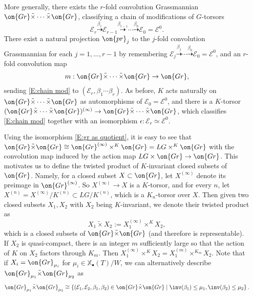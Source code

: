 \documentclass[11pt]{amsart}
\theoremstyle{definition}
\theoremstyle{definition}
\theoremstyle{definition}
\numberwithin{equation}{subsection}
\newcommand{\mE}{{\mathcal E}}
\newcommand{\Gr}{{\on{Gr}}}
\newcommand{\pr}{{\on{pr}}}
\def\xcoch{\mathbb{X}_\bullet}
\begin{document}
More generally, there exists the $r$-fold convolution Grassmannian $\Gr\tilde\times\cdots\tilde\times\Gr$, classifying a chain of modifications of $G$-torsors
\begin{equation}
\label{E:chain mod}
\mE_r\stackrel{\beta_r}{\dashrightarrow}\mE_{r-1}\stackrel{\beta_{r-1}}{\dashrightarrow}\cdots\stackrel{\beta_0}{\dashrightarrow}\mE_0=\mE^0.
\end{equation}
There exist a natural projection $\pr_j$ to the $j$-fold convolution Grassmannian for each $j=1,\ldots,r-1$ by remembering $\mE_j\stackrel{\beta_j}{\dashrightarrow}\cdots\stackrel{\beta_0}{\dashrightarrow}\mE_0=\mE^0$, and
an $r$-fold convolution map
\begin{equation}\label{conv m}
m:\Gr\tilde\times\cdots\tilde\times\Gr\to \Gr,
\end{equation}
sending \eqref{E:chain mod} to $(\mE_r, \beta_1\cdots\beta_r)$. As before, $K$ acts naturally on $\Gr\tilde\times\cdots\tilde\times\Gr$ as automorphisms of $\mE_0=\mE^0$, and there is a $K$-torsor $(\Gr\tilde\times\cdots\tilde\times\Gr)^{(\infty)}\to\Gr\tilde\times\cdots\tilde\times\Gr$, which classifies \eqref{E:chain mod} together with an isomorphism $\epsilon:\mE_r\simeq \mE^0$.


Using the isomorphism \eqref{E:gr as quotient}, it is easy to see that $\Gr\tilde\times\Gr\cong \Gr^{(\infty)}\times^K\Gr=LG\times^K\Gr$
with the convolution map induced by the action map $LG\times\Gr\to \Gr$. 
This motivates us to define the twisted product of $K$-invariant closed subsets of $\Gr$. Namely,
for a closed subset $X\subset \Gr$, let $X^{(\infty)}$ denote its preimage in $\Gr^{(\infty)}$. So $X^{(\infty)}\to X$ is a $K$-torsor, and for every $n$, let $X^{(n)}=X^{(\infty)}/K^{(n)}\subset LG/K^{(n)}$, which is a $K_n$-torsor over $X$.
Then given two closed subsets $X_1, X_2$ with $X_2$ being $K$-invariant, we denote their twisted product as
\begin{equation}
\label{E-conv Sch}
X_1\tilde\times X_2:= X_1^{(\infty)}\times^K X_2,
\end{equation}
which is a closed subsets of $\Gr\tilde\times\Gr$ (and therefore is representable). If $X_2$ is quasi-compact, there is an integer $m$ sufficiently large so that the action of $K$ on $X_2$ factors through $K_m$. 
Then $X_1^{(\infty)}\times^K X_2=X_1^{(m)}\times^{K_m}X_2$.  Note that
if $X_i=\Gr_{\mu_i}$ for $\mu_i\in \xcoch(T)/W$, we can alternatively describe $\Gr_{\mu_1}\tilde{\times}\Gr_{\mu_2}$ as
\[\Gr_{\mu_1}\tilde{\times}\Gr_{\mu_2}\cong \left\{(\mE_1,\mE_2,\beta_1,\beta_2)\in\Gr\tilde\times\Gr\mid \inv(\beta_1)\leq \mu_1, \inv(\beta_2)\leq \mu_2\right\}.\]
\end{document}
